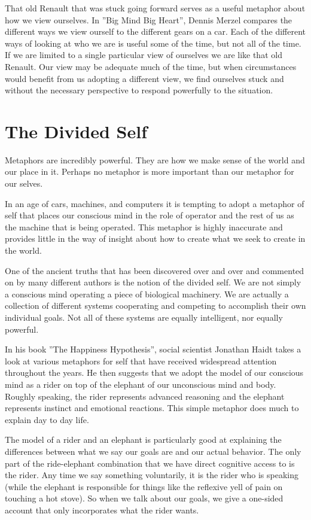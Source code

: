 \documentclass[ebook,12pt,openany,twoside]{memoir}
\begin{document}
That old Renault that was stuck going forward serves as a useful metaphor about
how we view ourselves. In ''Big Mind Big Heart'', Dennis Merzel compares the
different ways we view ourself to the different gears on a car. Each of the
different ways of looking at who we are is useful some of the time, but not all
of the time. If we are limited to a single particular view of ourselves we are
like that old Renault. Our view may be adequate much of the time, but when
circumstances would benefit from us adopting a different view, we find
ourselves stuck and without the necessary perspective to respond powerfully to
the situation.

\chapter{The Divided Self}

Metaphors are incredibly powerful. They are how we make sense of the world and
our place in it. Perhaps no metaphor is more important than our metaphor for
our selves.

In an age of cars, machines, and computers it is tempting to adopt a metaphor
of self that places our conscious mind in the role of operator and the rest of
us as the machine that is being operated. This metaphor is highly inaccurate
and provides little in the way of insight about how to create what we seek to
create in the world.

One of the ancient truths that has been discovered over and over and commented
on by many different authors is the notion of the divided self. We are not
simply a conscious mind operating a piece of biological machinery. We are
actually a collection of different systems cooperating and competing to
accomplish their own individual goals. Not all of these systems are equally
intelligent, nor equally powerful.

In his book ''The Happiness Hypothesis'', social scientist Jonathan Haidt takes
a look at various metaphors for self that have received widespread attention
throughout the years. He then suggests that we adopt the model of our conscious
mind as a rider on top of the elephant of our unconscious mind and body.
Roughly speaking, the rider represents advanced reasoning and the elephant
represents instinct and emotional reactions. This simple metaphor does much to
explain day to day life.

The model of a rider and an elephant is particularly good at explaining the
differences between what we say our goals are and our actual behavior. The only
part of the ride-elephant combination that we have direct cognitive access to
is the rider. Any time we say something voluntarily, it is the rider who is
speaking (while the elephant is responsible for things like the reflexive yell
of pain on touching a hot stove). So when we talk about our goals, we give a
one-sided account that only incorporates what the rider wants.
 
\end{document}
